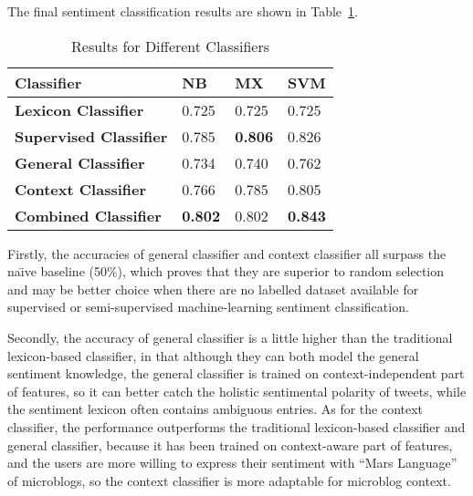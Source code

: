 The final sentiment classification results are shown in Table~\ref{t1}. 
\begin{table}[!t]
\caption{Results for Different Classifiers}
\label{t1}
\centering
\begin{tabular}{|l||l|l|l|}
\hline
\bfseries Classifier &  \bfseries NB    &   \bfseries MX    &   \bfseries SVM    \\
\hline
\bfseries Lexicon Classifier & 0.725 & 0.725 & 0.725 \\
\hline
\bfseries Supervised Classifier & 0.785 & \textbf{0.806} & 0.826 \\
\hline
\bfseries General Classifier & 0.734 &  0.740 & 0.762 \\
\hline
\bfseries Context Classifier & 0.766 & 0.785 & 0.805 \\
\hline
\bfseries Combined Classifier & \textbf{0.802} & 0.802 & \textbf{0.843} \\
\hline
\end{tabular}
\end{table}

Firstly, the accuracies of general classifier and context classifier all surpass the na\"\i ve baseline (50\%), which proves that they are superior to random selection and may be better choice when there are no labelled dataset available for supervised or semi-supervised machine-learning sentiment classification.

Secondly, the accuracy of general classifier is a little higher than the traditional lexicon-based classifier, in that although they can both model the general sentiment knowledge, the general classifier is trained on context-independent part of features, so it can better catch the holistic sentimental polarity of tweets, while the sentiment lexicon often contains ambiguous entries. 
As for the context classifier, the performance outperforms the traditional lexicon-based classifier and general classifier, because it has been trained on context-aware part of features, and the users are more willing to express their sentiment with ``Mars Language'' of microblogs, so the context classifier is more adaptable for microblog context.

